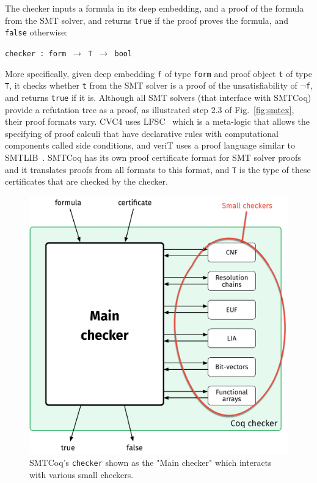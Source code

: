 \documentclass{article}
\begin{document}
	The checker inputs a formula in its 
	deep embedding, and a proof of the 
	formula from the SMT solver, and 
	returns \texttt{true} if the proof 
	proves the formula, and 
	\texttt{false} otherwise:
	\begin{center}
		\texttt{checker : form 
			$\to$ T $\to$ bool}	
	\end{center}
	More specifically, given deep embedding 
	\texttt{f} of type \texttt{form}
	and proof object \texttt{t} of type 
	\texttt{T}, it checks whether \texttt{t} 
	from the SMT solver is a proof of the 
	unsatisfiability of	\texttt{$\neg$f}, and 
	returns \texttt{true} if it is. 
	Although all SMT solvers (that 
	interface with SMTCoq) provide a
	refutation tree as a proof, as 
	illustrated step 2.3 of 
	Fig.~\ref{fig:smtex},
	their proof formats vary. CVC4 uses 
	LFSC~\cite{DBLP:journals/fmsd/StumpORHT13}
	which is a meta-logic that allows the 
	specifying of proof calculi that have 
	declarative	rules with computational 
	components called side conditions, and 
	veriT uses a proof language similar to 
	SMTLIB~\cite{Besson1}. SMTCoq has its 
	own proof certificate format for SMT 
	solver proofs and it translates proofs 
	from all formats to this format, 
	and \texttt{T} is the type of 
	these certificates that are 
	checked by the checker. 
	
	\begin{figure}[t]
	\begin{center}
	\includegraphics[scale=0.3]{checker}
		\caption{SMTCoq's \texttt{checker}
		shown as the "Main checker" which 
		interacts with various small checkers.}
		\label{fig:checker}
	\end{center}
	\end{figure}
		
\end{document}
